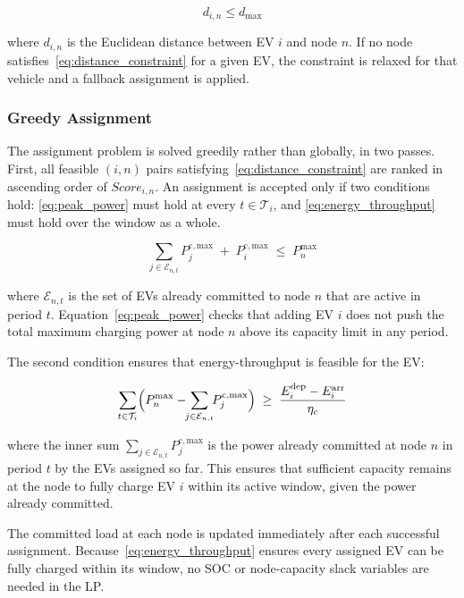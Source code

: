 \documentclass[sustainability,article,submit,moreauthors,pdftex]{Definitions/mdpi}
\begin{document}
\begin{equation}
d_{i,n} \le d_{\max}
\label{eq:distance_constraint}
\end{equation}

where $d_{i,n}$ is the Euclidean distance between EV $i$ and node $n$. If no node satisfies~\eqref{eq:distance_constraint} for a given EV, the constraint is relaxed for that vehicle and a fallback assignment is applied.

\subsubsection{Greedy Assignment}

The assignment problem is solved greedily rather than globally, in two passes. First, all feasible $(i,n)$ pairs satisfying~\eqref{eq:distance_constraint} are ranked in ascending order of $Score_{i,n}$. An assignment is accepted only if two conditions hold: \eqref{eq:peak_power} must hold at every $t \in \mathcal{T}_i$, and \eqref{eq:energy_throughput} must hold over the window as a whole.

\begin{equation}
    \sum_{j \in \mathcal{E}_{n,t}} P^{\mathrm{c,max}}_{j}
    \;+\;
    P^{\mathrm{c,max}}_{i}
    \;\le\;
    P_n^{\max}
    \label{eq:peak_power}
\end{equation}

where $\mathcal{E}_{n,t}$ is the set of EVs already committed to node $n$ that are active in period $t$. Equation~\eqref{eq:peak_power} checks that adding EV $i$ does not push the total maximum charging power at node $n$ above its capacity limit in any period.

The second condition ensures that energy-throughput is feasible for the EV:

\begin{equation}
    \sum_{t \in \mathcal{T}_i}
    \Bigl( P_n^{\max} - \!\!\sum_{j \in \mathcal{E}_{n,t}} \!\! P^{\mathrm{c,max}}_{j} \Bigr)
    \;\ge\;
    \frac{E_i^{\mathrm{dep}} - E_i^{\mathrm{arr}}}{\eta_c}
    \label{eq:energy_throughput}
\end{equation}

where the inner sum $\sum_{j \in \mathcal{E}_{n,t}} P^{\mathrm{c,max}}_{j}$ is the power already committed at node $n$ in period $t$ by the EVs assigned so far. This ensures that sufficient capacity remains at the node to fully charge EV $i$ within its active window, given the power already committed.

The committed load at each node is updated immediately after each successful assignment. Because~\eqref{eq:energy_throughput} ensures every assigned EV can be fully charged within its window, no SOC or node-capacity slack variables are needed in the LP.
\end{document}
